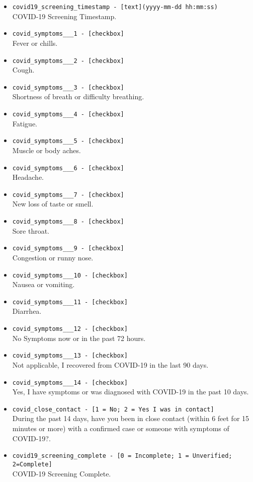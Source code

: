 \begin{description}
\begin{addmargin}[0em]{0em}
\begin{addmargin}[1em]{0em}
\begin{itemize}
            \item \verb|covid19_screening_timestamp - [text](yyyy-mm-dd hh:mm:ss)|\\COVID-19 Screening Timestamp.
            \item \verb|covid_symptoms___1 - [checkbox]|\\Fever or chills.
            \item \verb|covid_symptoms___2 - [checkbox]|\\Cough.
            \item \verb|covid_symptoms___3 - [checkbox]|\\Shortness of breath or difficulty breathing.
            \item \verb|covid_symptoms___4 - [checkbox]|\\Fatigue.
            \item \verb|covid_symptoms___5 - [checkbox]|\\Muscle or body aches.
            \item \verb|covid_symptoms___6 - [checkbox]|\\Headache.
            \item \verb|covid_symptoms___7 - [checkbox]|\\New loss of taste or smell.
            \item \verb|covid_symptoms___8 - [checkbox]|\\Sore throat.
            \item \verb|covid_symptoms___9 - [checkbox]|\\Congestion or runny nose.
            \item \verb|covid_symptoms___10 - [checkbox]|\\Nausea or vomiting.
            \item \verb|covid_symptoms___11 - [checkbox]|\\Diarrhea.
            \item \verb|covid_symptoms___12 - [checkbox]|\\No Symptoms now or in the past 72 hours.
            \item \verb|covid_symptoms___13 - [checkbox]|\\Not applicable, I recovered from COVID-19 in the last 90 days.
            \item \verb|covid_symptoms___14 - [checkbox]|\\Yes, I have symptoms or was diagnosed with COVID-19 in the past 10 days.
            \item \verb|covid_close_contact - [1 = No; 2 = Yes I was in contact]|\\During the past 14 days, have you been in close contact (within 6 feet for 15 minutes or more) with a confirmed case or someone with symptoms of COVID-19?.
            \item \verb|covid19_screening_complete - [0 = Incomplete; 1 = Unverified; 2=Complete]|\\COVID-19 Screening Complete.\\


\end{itemize}
\end{addmargin}
\end{addmargin}
\end{description}
